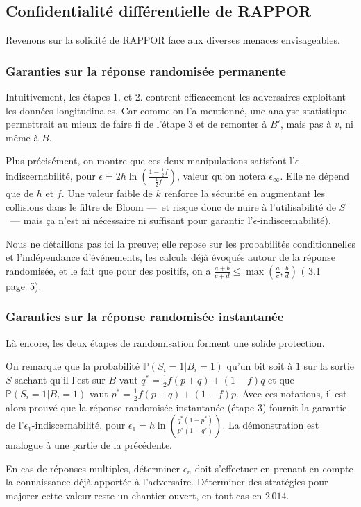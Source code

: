 \documentclass[a4paper,11pt]{article} %
\begin{document}
\subsection{Confidentialité différentielle de RAPPOR}
%
Revenons sur la solidité de RAPPOR face aux diverses menaces envisageables.
%
\subsubsection{Garanties sur la réponse randomisée permanente}
%
Intuitivement, les étapes 1. et 2. contrent efficacement les adversaires exploitant les données longitudinales. Car comme on l'a mentionné, une analyse statistique permettrait au mieux de faire fi de l'étape 3 et de remonter à $B'$, mais pas à $v$, ni même à $B$.

Plus précisément, on montre que ces deux manipulations satisfont l'$\epsilon$-indiscernabilité, pour $\epsilon = 2h\ln\left(\frac{1-\frac{1}{2}f}{\frac{1}{2}f}\right)$, valeur qu'on notera $\epsilon_\infty$. Elle ne dépend que de $h$ et $f$. Une valeur faible de $k$ renforce la sécurité en augmentant les collisions dans le filtre de Bloom ---~et risque donc de nuire à l'utilisabilité de $S$~--- mais ça n'est ni nécessaire ni suffisant pour garantir l'$\epsilon$-indiscernabilité). 

Nous ne détaillons pas ici la preuve; elle repose sur les probabilités conditionnelles et l'indépendance d'événements, les calculs déjà évoqués autour de la réponse randomisée, et le fait que pour des positifs, on a $\frac{a+b}{c+d}\leqslant\max\left(\frac{a}{c},\frac{b}{d}\right)$ (\cite{EPK14} 3.1 page~5).

%
\subsubsection{Garanties sur la réponse randomisée instantanée}
%
Là encore, les deux étapes de randomisation forment une solide protection. 

On remarque que la probabilité $\mathbb{P}(S_i=1|B_i=1)$ qu'un bit soit à $1$ sur la sortie $S$ sachant qu'il l'est sur $B$ vaut $q^*=\frac{1}{2}f(p+q) + (1-f)q$ et que $\mathbb{P}(S_i=1|B_i=1)$ vaut $p^*=\frac{1}{2}f(p+q) + (1-f)p$.
Avec ces notations, il est alors prouvé que la réponse randomisée instantanée (étape 3) fournit la garantie de l'$\epsilon_1$-indiscernabilité, pour $\epsilon_1 = h\ln\left(\frac{q^*(1-p^*)}{p^*(1-q^*)}\right)$. La démonstration est analogue à une partie de la précédente.

En cas de réponses multiples, déterminer $\epsilon_n$ doit s'effectuer en prenant en compte la connaissance déjà apportée à l'adversaire. Déterminer des stratégies pour majorer cette valeur reste un chantier ouvert, en tout cas en $2\,014$.\\[-0.4em]
\end{document}

